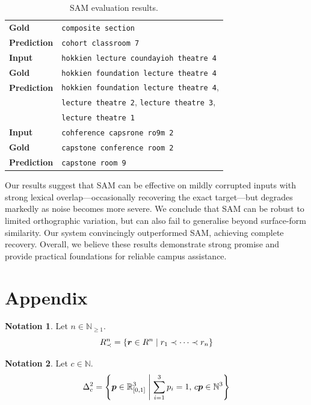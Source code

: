 \documentclass{article}
\theoremstyle{definition}
\newtheorem{notation}{Notation}
\newcommand{\N}{\mathbb{N}}
\newcommand{\R}{\mathbb{R}}
\begin{document}
\begin{table}[H]
\begin{tabularx}{\linewidth}{lX}
		\textbf{Gold} & \texttt{composite section} \\
		\textbf{Prediction} & \texttt{cohort classroom 7} \\
		\midrule
		\textbf{Input} & \texttt{hokkien lecture coundayioh theatre 4} \\
		\textbf{Gold} & \texttt{hokkien foundation lecture theatre 4} \\
		\textbf{Prediction} & \texttt{hokkien foundation lecture theatre 4}, \\
		& \texttt{lecture theatre 2}, \texttt{lecture theatre 3}, \\
		& \texttt{lecture theatre 1} \\
		\midrule
		\textbf{Input} & \texttt{cohference capsrone ro9m 2} \\
		\textbf{Gold} & \texttt{capstone conference room 2} \\
		\textbf{Prediction} & \texttt{capstone room 9} \\
		\bottomrule
	\end{tabularx}
	\caption{SAM evaluation results.}
\end{table}

\newpage

Our results suggest that SAM can be effective on mildly corrupted inputs with strong lexical overlap---occasionally recovering the exact target---but degrades markedly as noise becomes more severe.
We conclude that SAM can be robust to limited orthographic variation,
but can also fail to generalise beyond surface-form similarity.
Our system convincingly outperformed SAM, achieving complete recovery.
Overall, we believe these results demonstrate strong promise
and provide practical foundations for reliable campus assistance.

\section{Appendix}

\begin{notation}
Let $n\in\N_{\geq 1}$.
$$
	R_{\prec}^{n}
	=
	\mleft\{
		\bm{r}\in R^{n}
		\;\middle|\;
		r_{1}\prec\dots\prec r_{n}
	\mright\}
$$
\end{notation}

\begin{notation}
Let $c\in\N$.
$$
	\Delta_{c}^{2}
	=
	\mleft\{
		\bm{p}\in\R_{[0,1]}^{3}
		\;\middle|\;
		\sum_{i=1}^{3}
		p_{i}
		=
		1
		,\,
		c\bm{p}\in\N^{3}
	\mright\}
$$
\end{notation}



\end{document}

